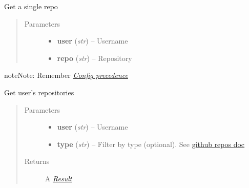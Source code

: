 \documentclass[letterpaper,10pt,english]{sphinxmanual}
\begin{document}
\begin{fulllineitems}
\begin{fulllineitems}
\end{fulllineitems}


\begin{fulllineitems}
\label{repos:pygithub3.services.repos.Repo.get}
Get a single repo
\begin{quote}\begin{description}
\item[{Parameters}] \leavevmode\begin{itemize}
\item {} 
\textbf{user} (\emph{str}) -- Username

\item {} 
\textbf{repo} (\emph{str}) -- Repository

\end{itemize}

\end{description}\end{quote}

\begin{notice}{note}{Note:}
Remember {\hyperref[repos:config-precedence]{\emph{Config precedence}}}
\end{notice}

\end{fulllineitems}


\begin{fulllineitems}
\label{repos:pygithub3.services.repos.Repo.list}
Get user's repositories
\begin{quote}\begin{description}
\item[{Parameters}] \leavevmode\begin{itemize}
\item {} 
\textbf{user} (\emph{str}) -- Username

\item {} 
\textbf{type} (\emph{str}) -- Filter by type (optional). See \href{http://developer.github.com/v3/repos}{github repos doc}

\end{itemize}

\item[{Returns}] \leavevmode
A {\hyperref[result::doc]{\emph{Result}}}


\end{description}
\end{quote}
\end{fulllineitems}
\end{fulllineitems}
\end{document}
